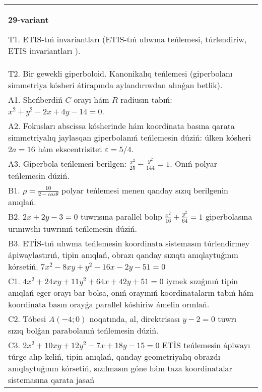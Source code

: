 \documentclass{article}
\begin{document}
\begin{tabular}{m{17cm}}
\textbf{29-variant}
\newline

T1. ETIS-tıń invariantları (ETIS-tıń ulıwma teńlemesi, túrlendiriw, ETIS invariantları ).\\

T2. Bir gewekli giperboloid. Kanonikalıq teńlemesi (giperbolanı simmetriya kósheri átirapında aylandırıwdan alınǵan betlik).\\

A1. Sheńberdiń $C$ orayı hám $R$ radiusın tabıń: $x^2+y^2-2 x+4 y-14=0$.\\

A2. Fokusları abscissa kósherinde hám koordinata basına qarata simmetriyalıq jaylasqan giperbolanıń teńlemesin dúziń: úlken kósheri $2 a=16$ hám ekscentrisitet $\varepsilon=5/4$.\\

A3. Giperbola teńlemesi berilgen: $\frac{x^{2}}{25}-\frac{y^{2}}{144}=1$. Onıń polyar teńlemesin dúziń.\\

B1. $\rho = \frac{10}{2 - cos\theta}$ polyar teńlemesi menen qanday sızıq berilgenin anıqlań.  \\

B2. $2x + 2y - 3 = 0$ tuwrısına parallel bolıp $\frac{x^{2}}{16} + \frac{y^{2}}{64} = 1$ giperbolasına urınıwshı tuwrınıń teńlemesin dúziń.  \\

B3. ETİS-tıń ulıwma teńlemesin koordinata sistemasın túrlendirmey ápiwaylastırıń, tipin anıqlań, obrazı qanday sızıqtı anıqlaytuǵının kórsetiń. $7x^{2} - 8xy + y^{2} - 16x - 2y - 51 = 0$  \\

C1. $4x^{2} + 24xy + 11y^{2} + 64x + 42y + 51 = 0$ iymek sızıǵınıń tipin anıqlań eger orayı bar bolsa, onıń orayınıń koordinataların tabıń hám koordinata basın orayǵa parallel kóshiriw ámelin orınlań.  \\

C2. Tóbesi $A(-4;0)$ noqatında, al, direktrisası $y - 2 = 0$ tuwrı sızıq bolǵan parabolanıń teńlemesin dúziń.\\

C3. $2x^{2} + 10xy + 12y^{2} - 7x + 18y - 15 = 0$ ETİS teńlemesin ápiwayı túrge alıp keliń, tipin anıqlań, qanday geometriyalıq obrazdı anıqlaytuǵının kórsetiń, sızılmasın góne hám taza koordinatalar sistemasına qarata jasań  \\

\end{tabular}
\vspace{1cm}
\end{document}
